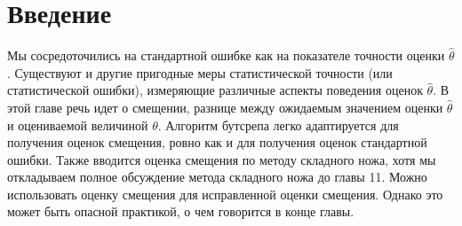 \section{Введение}

Мы сосредоточились на стандартной ошибке как на показателе точности оценки $\hat{\theta}$. Существуют и другие пригодные меры статистической точности (или статистической ошибки), измеряющие различные аспекты поведения оценок  $\hat{\theta}$. В этой главе речь идет о смещении, разнице между ожидаемым значением оценки $\hat{\theta}$ и оцениваемой величиной $\theta$. Алгоритм бутсрепа легко адаптируется для получения оценок смещения, ровно как и для получения оценок стандартной ошибки. Также вводится оценка смещения по методу складного ножа, хотя мы откладываем полное обсуждение метода складного ножа до главы 11. Можно использовать оценку смещения для исправленной оценки смещения. Однако это может быть опасной практикой, о чем говорится в конце главы.

